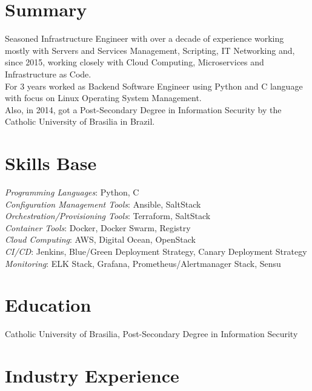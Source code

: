 \documentclass[margin]{res}
\begin{document}

\address{Winnipeg, MB, Canada \\
  \href{mailto:brunocriado@gmail.com}{brunocriado@gmail.com} \\ Phone: +1 431 588 3334}


\begin{resume}

  \section{Summary} Seasoned Infrastructure Engineer with over a decade of experience working mostly with Servers and Services
  Management, Scripting, IT Networking and, since 2015, working closely with Cloud Computing, Microservices and Infrastructure as Code.\\
  For 3 years worked as Backend Software Engineer using Python and C language with focus on Linux Operating System Management.\\
  Also, in 2014, got a Post-Secondary Degree in Information Security by the Catholic University of Brasilia in Brazil.

  \section{Skills Base}
  \textit{Programming Languages}: Python, C\\
  \textit{Configuration Management Tools}: Ansible, SaltStack\\
  \textit{Orchestration/Provisioning Tools}: Terraform, SaltStack\\
  \textit{Container Tools}: Docker, Docker Swarm, Registry\\
  \textit{Cloud Computing}: AWS, Digital Ocean, OpenStack\\
  \textit{CI/CD}: Jenkins, Blue/Green Deployment Strategy, Canary Deployment Strategy\\
  \textit{Monitoring}: ELK Stack, Grafana, Prometheus/Alertmanager Stack, Sensu\\

  \section{Education} Catholic University of Brasilia, Post-Secondary Degree in Information
  Security

  \section{Industry Experience}


\end{resume}
\end{document}
